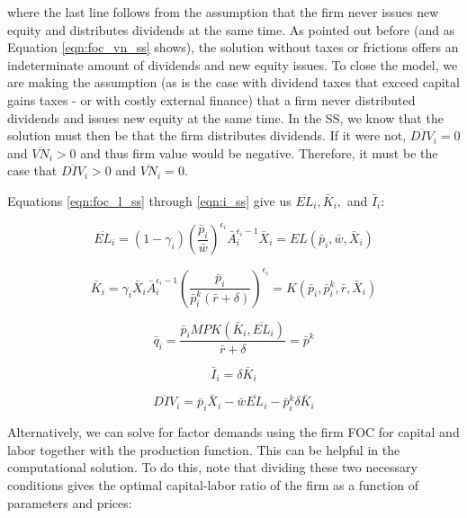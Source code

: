 \documentclass[letterpaper,12pt]{article}
\theoremstyle{definition}
\begin{document}
\begin{spacing}{1.5}
\noindent\noindent where the last line follows from the assumption that the firm never issues new equity and distributes dividends at the same time.  As pointed out before (and as Equation \ref{eqn:foc_vn_ss} shows), the solution without taxes or frictions offers an indeterminate amount of dividends and new equity issues.  To close the model, we are making the assumption (as is the case with dividend taxes that exceed capital gains taxes - or with costly external finance) that a firm never distributed dividends and issues new equity at the same time.  In the SS, we know that the solution must then be that the firm distributes dividends.  If it were not, $\overline{DIV}_{i}=0$ and $\overline{VN}_{i}>0$ and thus firm value would be negative.  Therefore, it must be the case that $\overline{DIV}_{i}>0$ and $\overline{VN}_{i}=0$.

Equations \ref{eqn:foc_l_ss} through \ref{eqn:i_ss} give us $\overline{EL}_{i}, \bar{K}_{i},$ and $\bar{I}_{i}$:

\begin{equation}
\label{eqn:l_ss}
\overline{EL}_{i} = (1-\gamma_{i}) \left( \frac{ \bar{p}_{i}}{\bar{w}}\right)^{\epsilon_{i}}\bar{A}_{i}^{\epsilon_{i}-1}\bar{X}_{i} = EL(\bar{p}_{i},\bar{w},\bar{X}_{i})
\end{equation}

\begin{equation}
\label{eqn:k_ss}
\bar{K}_{i} = \gamma_{i}\bar{X}_{i}\bar{A}_{i}^{\epsilon_{i}-1} \left(\frac{\bar{p}_{i}}{\bar{p}^{k}_{i}(\bar{r}+\delta)} \right)^{\epsilon_{i}} = K(\bar{p}_{i},\bar{p}^{k}_{i},\bar{r},\bar{X}_{i})
\end{equation}

\begin{equation}
\label{eqn:q_ss}
\bar{q}_{i} = \frac{\bar{p}_{i}MPK(\bar{K}_{i},\overline{EL}_{i})}{\bar{r}+\delta}=\bar{p}^{k}
\end{equation}

\begin{equation}
\label{eqn:i_ss2}
\bar{I}_{i} = \delta \bar{K}_{i}
\end{equation}

\begin{equation}
\label{eqn:div_ss}
\overline{DIV}_{i} = \bar{p}_{i}\bar{X}_{i}-\bar{w}\overline{EL}_{i}-\bar{p}^{k}_{i}\delta \bar{K}_{i}
\end{equation}


Alternatively, we can solve for factor demands using the firm FOC for capital and labor together with the production function.  This can be helpful in the computational solution.  To do this, note that dividing these two necessary conditions gives the optimal capital-labor ratio of the firm as a function of parameters and prices:


\end{spacing}
\end{document}

